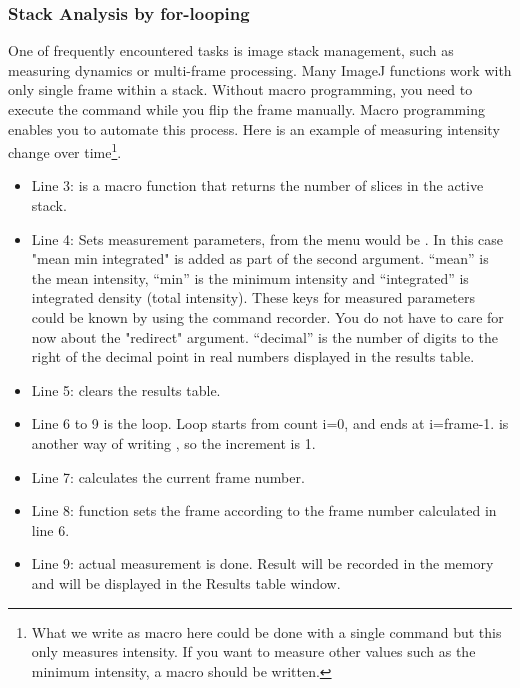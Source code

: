 \subsubsection{Stack Analysis by for-looping}
\label{sec:forloopStack}
One of frequently encountered tasks is image stack management, 
such as measuring dynamics or multi-frame processing. 
Many ImageJ functions work with only single frame within a stack. 
Without macro programming, you need to execute the command while you flip the frame manually. 
Macro programming enables you to automate this process. 
Here is an example of measuring intensity change over time\footnote{What we write as macro here could be done with a single command  but this only measures intensity. If you want to measure other values such as the minimum intensity, a macro should be written. }. 

\label{code:10}


\begin{itemize}
\item Line 3:  is a macro function that returns the number of slices in the active stack. 

\item Line 4: Sets measurement parameters, from the menu would be . In this case "mean min integrated" is added as part of the second argument. ``mean'' is the mean intensity, ``min'' is the minimum intensity and ``integrated'' is integrated density (total intensity). These keys for measured parameters could be known by using the command recorder. 
You do not have to care for now about the "redirect" argument. ``decimal'' is the number of digits to 
the right of the decimal point in real numbers displayed in the results table. 

\item Line 5: clears the results table. 

\item Line 6 to 9 is the loop. Loop starts from count i=0, and ends at i=frame-1.  is another way of writing , so the increment is 1.  

\item Line 7: calculates the current frame number. 

\item Line 8:  function sets the frame according to the frame number calculated in line 6. 

\item Line 9:  actual measurement is done. 
Result will be recorded in the memory and will be displayed in the Results table window. 
\end{itemize}

